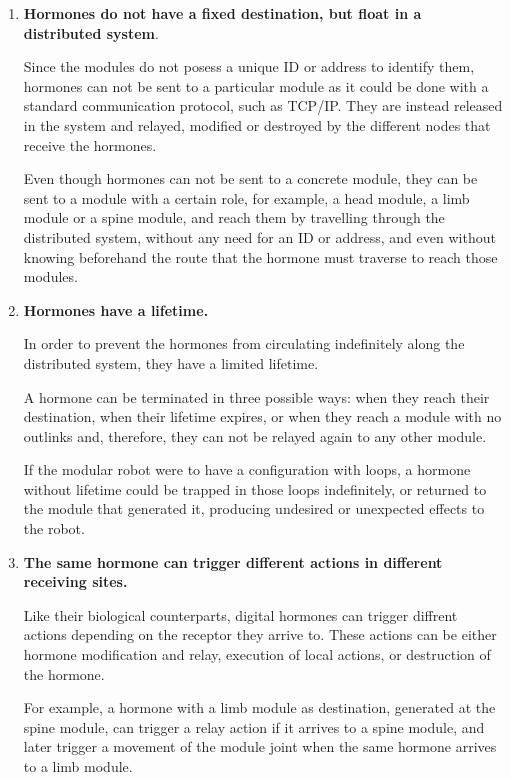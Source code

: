 \begin{enumerate}
	\item {\bfseries Hormones do not have a fixed destination, but float in a distributed system}.
	
	 Since the modules do not posess a unique ID or address to identify them, hormones can not be sent to a particular module as it could be done with a standard communication protocol, such as TCP/IP. They are instead released in the system and relayed, modified or destroyed by the different nodes that receive the hormones.
	
	Even though hormones can not be sent to a concrete module, they can be sent to a module with a certain role, for example, a head module, a limb module or a spine module, and reach them by travelling through the distributed system, without any need for an ID or address, and even without knowing beforehand the route that the hormone must traverse to reach those modules.\\
	
	\item {\bfseries Hormones have a lifetime.}
	
	 In order to prevent the hormones from circulating indefinitely along the distributed system, they have a limited lifetime.
	
	A hormone can be terminated in three possible ways: when they reach their destination, when their lifetime expires, or when they reach a module with no outlinks and, therefore, they can not be relayed again to any other module.
	
	If the modular robot were to have a configuration with loops, a hormone without lifetime could be trapped in those loops indefinitely, or returned to the module that generated it, producing undesired or unexpected effects to the robot.\\
	
	\item {\bfseries The same hormone can trigger different actions in different receiving sites. }
	
	Like their biological counterparts, digital hormones can trigger diffrent actions depending on the receptor they arrive to. These actions can be either hormone modification and relay, execution of local actions, or destruction of the hormone.
	
	For example, a hormone with a limb module as destination, generated at the spine module, can trigger a relay action if it arrives to a spine module, and later trigger a movement of the module joint when the same hormone arrives to a limb module.

\end{enumerate}
~\\

